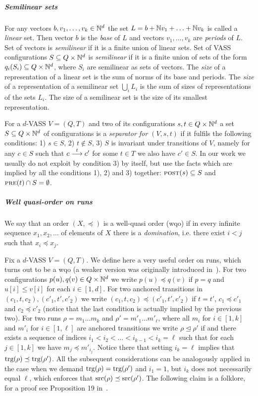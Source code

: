 \subparagraph*{Semilinear sets}
For any vectors $b, v_1, \ldots, v_k \in \mathbb{N}^d$ the set $L = b + \mathbb{N} v_1 + \ldots + \mathbb{N} v_k$ is called a \emph{linear} set.
Then vector $b$ is the \emph{base} of $L$ and vectors $v_1, \ldots, v_k$ are \emph{periods} of $L$.
Set of vectors is \emph{semilinear} if it is a finite union of linear sets.
Set of VASS configurations $S \subseteq Q \times \mathbb{N}^d$ is \emph{semilinear} if it is a finite union of sets of the
form $q_i(S_i) \subseteq Q \times \mathbb{N}^d$, where $S_i$ are semilinear as sets of vectors.
The \emph{size} of a representation of a linear set is the sum of norms of its base and periods.
The \emph{size} of a representation of a semilinear set $\bigcup_i L_i$ is the sum of sizes of representations of the sets $L_i$.
The size of a semilinear set is the size of its smallest representation.

For a $d$-VASS $V = (Q, T)$ and two of its configurations $s, t \in Q \times \mathbb{N}^d$ a set $S \subseteq Q \times \mathbb{N}^d$
of configurations is a \emph{separator for $(V, s, t)$} if it fulfils the following conditions:
1) $s \in S$, 2) $t \not\in S$, 3) $S$ is invariant under transitions of $V$, namely for any $c \in S$ such that $c \stackrel{t}{\longrightarrow} c'$
for some $t \in T$ we also have $c' \in S$. In our work we usually do not exploit by condition 3) by itself,
but use the facts which are implied by all the conditions 1), 2) and 3) together: $\textsc{post}(s) \subseteq S$ and $\textsc{pre}(t) \cap S = \emptyset$.


\subparagraph*{Well quasi-order on runs}
We say that an order $(X, \preceq)$ is a well-quasi order (wqo) if in every infinite sequence $x_1, x_2, \ldots$ of elements of $X$
there is a \emph{domination}, i.e. there exist $i < j$ such that $x_i \preceq x_j$. 

Fix a $d$-VASS $V = (Q, T)$.
We define here a very useful order on runs, which turns out to be a wqo (a weaker version was originally introduced in~\cite{DBLP:journals/tcs/Jancar90}).
For two configurations $p(u), q(v) \in Q \times \mathbb{N}^d$ we write $p(u) \preceq q(v)$ if $p = q$ and $u[i] \leq v[i]$ for each $i \in [1,d]$.
For two anchored transitions in $(c_1, t, c_2), (c'_1, t', c'_2)$ we write $(c_1, t, c_2) \preceq (c'_1, t', c'_2)$
if $t = t'$, $c_1 \preceq c'_1$ and $c_2 \preceq c'_2$ (notice that the last condition is actually implied by the previous two).
For two runs $\rho = m_1 \ldots m_k$ and $\rho' = m'_1 \ldots m'_\ell$, where all $m_i$ for $i \in [1,k]$
and $m'_i$ for $i \in [1,\ell]$ are anchored transitions we write
$\rho \unlhd \rho'$ if and there exists a sequence of indices $i_1 < i_2 < \ldots < i_{k-1} < i_k = \ell$ such that
for each $j \in [1,k]$ we have $m_j \preceq m'_{i_j}$. Notice there that setting $i_k = \ell$ implies that $\textup{trg}(\rho) \preceq \textup{trg}(\rho')$.
All the subsequent considerations can be analogously applied in the case when we demand $\textup{trg}(\rho) = \textup{trg}(\rho')$
and $i_1 = 1$, but $i_k$ does not necessarily equal $\ell$, which enforces that $\textup{src}(\rho) \preceq \textup{src}(\rho')$.
The following claim is a folklore, for a proof see Proposition 19 in~\cite{DBLP:conf/stacs/ClementeCLP17}.

